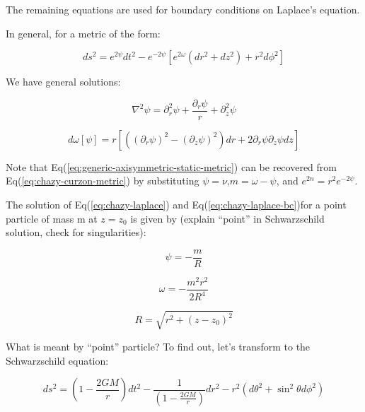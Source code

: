 \documentclass{article}
\begin{document}
The remaining equations are used for boundary conditions on Laplace's
equation.

In general, for a metric of the form:

\begin{equation}
ds^{2}=e^{2\psi}dt^{2}-e^{-2\psi}\left[e^{2\omega}\left(dr^{2}+dz^{2}\right)+r^{2}d\phi^{2}\right]\label{eq:chazy-curzon-metric}
\end{equation}


We have general solutions:

\begin{equation}
\nabla^{2}\psi=\partial_{r}^{2}\psi+\frac{\partial_{r}\psi}{r}+\partial_{z}^{2}\psi\label{eq:chazy-laplace}
\end{equation}


\begin{equation}
d\omega\left[\psi\right]=r\left[\left(\left(\partial_{r}\psi\right)^{2}-\left(\partial_{z}\psi\right)^{2}\right)dr+2\partial_{r}\psi\partial_{z}\psi dz\right]\label{eq:chazy-laplace-bc}
\end{equation}


Note that Eq(\ref{eq:generic-axisymmetric-static-metric}) can be
recovered from Eq(\ref{eq:chazy-curzon-metric}) by substituting $\psi=\nu$,$m=\omega-\psi$,
and $e^{2n}=r^{2}e^{-2\psi}$.

The solution of Eq(\ref{eq:chazy-laplace}) and Eq(\ref{eq:chazy-laplace-bc})for
a point particle of mass m at $z=z_{0}$ is given by (explain ``point''
in Schwarzschild solution, check for singularities):

\begin{equation}
\psi=-\frac{m}{R}
\end{equation}


\begin{equation}
\omega=-\frac{m^{2}r^{2}}{2R^{4}}
\end{equation}


\begin{equation}
R=\sqrt{r^{2}+\left(z-z_{0}\right)^{2}}
\end{equation}

What is meant by ``point'' particle? To find out, let's transform
to the Schwarzschild equation:

\begin{equation}
ds^{2}=\left(1-\frac{2GM}{r}\right)dt^{2}-\frac{1}{\left(1-\frac{2GM}{r}\right)}dr^{2}-r^{2}\left(d\theta^{2}+\sin^{2}\theta d\phi^{2}\right)
\end{equation}
\end{document}
